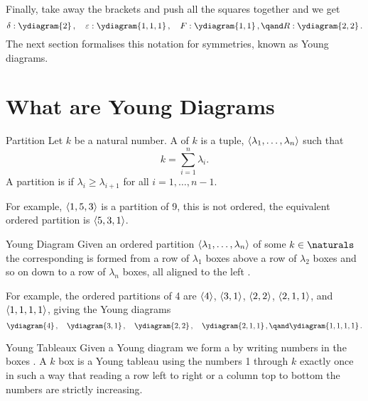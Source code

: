 \documentclass[fleqn]{NotesClass}
\DeclarePairedDelimiter{\tuple}{\langle}{\rangle}
\begin{document}
    Finally, take away the brackets and push all the squares together and we get
    \begin{equation}
        \delta: \ydiagram{2}\,, \quad \varepsilon:\ydiagram{1,1,1}\,, \quad F: \ydiagram{1,1}\,, \qand R: \ydiagram{2,2}\,.
    \end{equation}
    The next section formalises this notation for symmetries, known as Young diagrams.
    
    \section{What are Young Diagrams}
    \begin{dfn}{Partition}{}
        Let \(k\) be a natural number.
        A  of \(k\) is a tuple, \(\tuple{\lambda_1, \dotsc, \lambda_n}\) such that \cite[720]{hassani}
        \begin{equation}
            k = \sum_{i = 1}^{n} \lambda_i.
        \end{equation}
        A partition is  if \(\lambda_i \ge \lambda_{i+1}\) for all \(i = 1, \dotsc, n - 1\).
    \end{dfn}

    For example, \(\tuple{1,5,3}\) is a partition of 9, this is not ordered, the equivalent ordered partition is \(\tuple{5,3,1}\).
    
    \begin{dfn}{Young Diagram}{}
        Given an ordered partition \(\tuple{\lambda_1, \dotsc, \lambda_n}\) of some \(k \in \naturals\) the corresponding  is formed from a row of \(\lambda_1\) boxes above a row of \(\lambda_2\) boxes and so on down to a row of \(\lambda_n\) boxes, all aligned to the left \cite[87]{cvitanovic}.
    \end{dfn}
    
    For example, the ordered partitions of 4 are \(\tuple{4}\), \(\tuple{3,1}\), \(\tuple{2,2}\), \(\tuple{2,1,1}\), and \(\tuple{1,1,1,1}\), giving the Young diagrams
    \begin{equation}
        \ydiagram{4}\,, \quad \ydiagram{3,1}\,, \quad \ydiagram{2,2}\,, \quad \ydiagram{2,1,1}\,, \qand \ydiagram{1,1,1,1}\,.
    \end{equation}
    
    \begin{dfn}{Young Tableaux}{}
        Given a Young diagram we form a  by writing numbers in the boxes \cite[87]{cvitanovic}.
        A \(k\) box  is a Young tableau using the numbers 1 through \(k\) exactly once in such a way that reading a row left to right or a column top to bottom the numbers are strictly increasing.
    \end{dfn}
    
\end{document}

